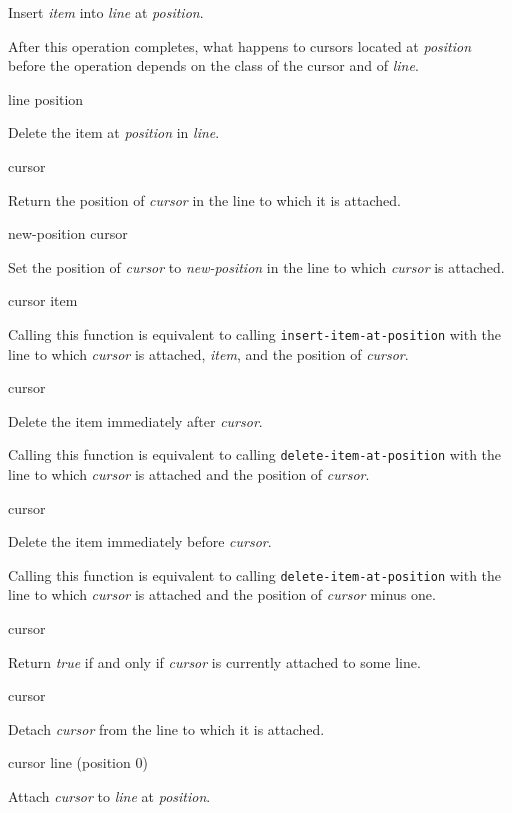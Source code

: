 Insert \textit{item} into \textit{line} at \textit{position}.

After this operation completes, what happens to cursors located at
\textit{position} before the operation depends on the class of the
cursor and of \textit{line}.

 {line position}

Delete the item at \textit{position} in \textit{line}.

 {cursor}

Return the position of \textit{cursor} in the line to which it is
attached.

 {new-position cursor}

Set the position of \textit{cursor} to \textit{new-position} in the
line to which \textit{cursor} is attached.

 {cursor item}

Calling this function is equivalent to calling
\texttt{insert-item-at-position} with the line to which
\textit{cursor} is attached, \textit{item}, and the position of
\textit{cursor}.

 {cursor}

Delete the item immediately after \emph{cursor}.

Calling this function is equivalent to calling
\texttt{delete-item-at-position} with the line to which
\textit{cursor} is attached and the position of \textit{cursor}.

 {cursor}

Delete the item immediately before \emph{cursor}.

Calling this function is equivalent to calling
\texttt{delete-item-at-position} with the line to which
\textit{cursor} is attached and the position of \textit{cursor} minus
one.

 {cursor}

Return \emph{true} if and only if \textit{cursor} is currently
attached to some line.

 {cursor}

Detach \textit{cursor} from the line to which it is attached.

 {cursor line \optional (position 0)}

Attach \textit{cursor} to \textit{line} at \textit{position}.

